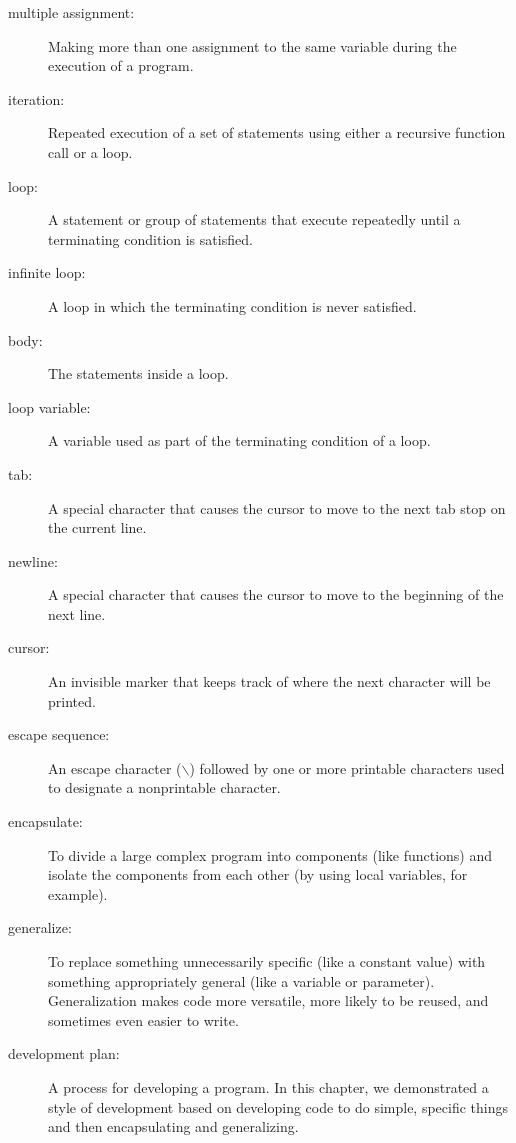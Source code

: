 \begin{description}

\item[multiple assignment:] Making more than one assignment to the same
variable during the execution of a program.

\item[iteration:] Repeated execution of a set of statements using
either a recursive function call or a loop.

\item[loop:] A statement or group of statements that execute repeatedly until
a terminating condition is satisfied.

\item[infinite loop:] A loop in which the terminating condition is
never satisfied.

\item[body:] The statements inside a loop.

\item[loop variable:] A variable used as part of the terminating
condition of a loop.

\item[tab:] A special character that causes the cursor to move to
the next tab stop on the current line.

\item[newline:] A special character that causes the cursor to move to the
beginning of the next line.

\item[cursor:] An invisible marker that keeps track of where the next
character will be printed.

\item[escape sequence:] An escape character ($\backslash$) followed by one or
more printable characters used to designate a nonprintable character.

\item[encapsulate:] To divide a large complex program into components
(like functions) and isolate the components from each other (by
using local variables, for example).

\item[generalize:] To replace something unnecessarily specific (like a constant
value) with something appropriately general (like a variable or parameter).
Generalization makes code more versatile, more likely to be reused, and
sometimes even easier to write.

\item[development plan:] A process for developing a program. In this chapter,
we demonstrated a style of development based on developing code to do
simple, specific things and then encapsulating and generalizing.


\end{description}
